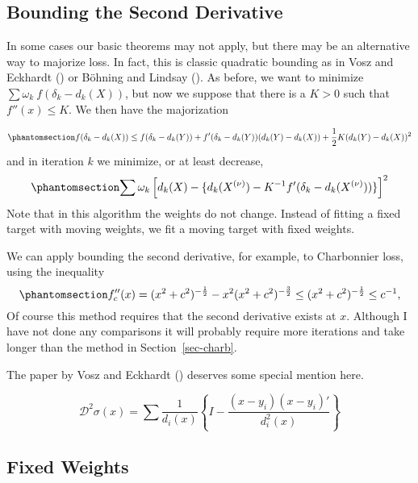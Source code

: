 \documentclass[
  12pt,
  letterpaper,
  DIV=11,
  numbers=noendperiod]{scrartcl}
\theoremstyle{plain}
\theoremstyle{plain}
\theoremstyle{plain}
\theoremstyle{definition}
\theoremstyle{definition}
\theoremstyle{remark}
\begin{document}
\subsection{Bounding the Second
Derivative}\label{bounding-the-second-derivative}

In some cases our basic theorems may not apply, but there may be an
alternative way to majorize loss. In fact, this is classic quadratic
bounding as in Vosz and Eckhardt ()
or Böhning and Lindsay (). As
before, we want to minimize \(\sum \omega_k\ f(\delta_k-d_k(X))\), but
now we suppose that there is a \(K>0\) such that \(f''(x)\leq K\). We
then have the majorization

\begin{equation}\phantomsection\label{eq-qbound}{
f(\delta_k-d_k(X))\leq f(\delta_k-d_k(Y))+f'(\delta_k-d_k(Y))(d_k(Y)-d_k(X))+\frac12K(d_k(Y)-d_k(X))^2
}\end{equation} and in iteration \(k\) we minimize, or at least
decrease, \begin{equation}\phantomsection\label{eq-qiter}{
\sum \omega_k\left[d_k(X)-\{d_k(X^{(\nu)})-K^{-1}f'(\delta_k-d_k(X^{(\nu)}))\}\right]^2
}\end{equation} Note that in this algorithm the weights do not change.
Instead of fitting a fixed target with moving weights, we fit a moving
target with fixed weights.

We can apply bounding the second derivative, for example, to Charbonnier
loss, using the inequality
\begin{equation}\phantomsection\label{eq-chark}{
f_c''(x)=(x^2 + c^2)^{-\frac12}-x^2(x^2 + c^2)^{-\frac32}\leq(x^2 + c^2)^{-\frac12}\leq c^{-1},
}\end{equation} Of course this method requires that the second
derivative exists at \(x\). Although I have not done any comparisons it
will probably require more iterations and take longer than the method in
Section~\ref{sec-charb}.

The paper by Vosz and Eckhardt ()
deserves some special mention here.

\[
\mathcal{D}^2\sigma(x)=\sum\frac{1}{d_i(x)}\left\{I-\frac{(x-y_i)(x-y_i)'}{d_i^2(x)}\right\}
\]

\subsection{Fixed Weights}\label{fixed-weights}
\end{document}
